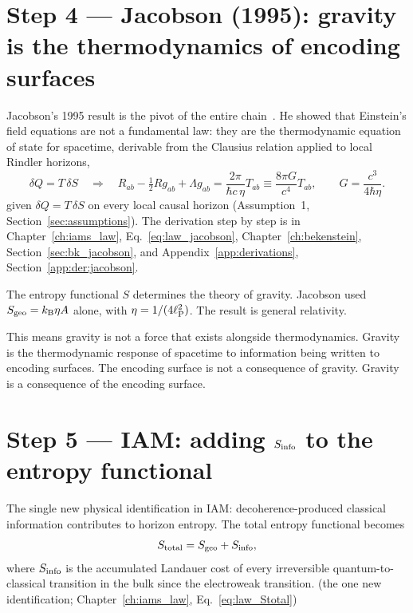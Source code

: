 \section{Step 4 --- Jacobson (1995): gravity is the thermodynamics of encoding surfaces}\label{app:sat:step4}
Jacobson's 1995 result is the pivot of the entire chain~\cite{Jacobson1995}. He showed that Einstein's field equations are not a fundamental
law: they are the thermodynamic equation of state for spacetime, derivable from the Clausius relation applied to local Rindler horizons,
\begin{equation}
\delta Q=T\,\delta S\quad\Longrightarrow\quad
R_{ab}-\tfrac12Rg_{ab}+\Lambda g_{ab}=\frac{2\pi}{\hbar c\,\eta}T_{ab}\equiv\frac{8\pi G}{c^4}T_{ab},\qquad G=\frac{c^3}{4\hbar\eta}. \label{eq:sat_jacobson}
\end{equation}
\derived{} given $\delta Q=T\,\delta S$ on every local causal horizon (Assumption~1, Section~\ref{sec:assumptions}). The derivation step by step is in
Chapter~\ref{ch:iams_law}, Eq.~\eqref{eq:law_jacobson}, Chapter~\ref{ch:bekenstein}, Section~\ref{sec:bk_jacobson}, and
Appendix~\ref{app:derivations}, Section~\ref{app:der:jacobson}.

The entropy functional $S$ determines the theory of gravity. Jacobson used $S_{\rm geo}=k_{\mathrm B}\eta A$ alone, with $\eta=1/(4\ell_{\mathrm P}^2)$. The result is
general relativity.

This means gravity is not a force that exists alongside thermodynamics. Gravity is the thermodynamic response of spacetime to information being
written to encoding surfaces. The encoding surface is not a consequence of gravity. Gravity is a consequence of the encoding surface. \interp

\section{Step 5 --- IAM: adding $S_{\rm info}$ to the entropy functional}\label{app:sat:step5}
The single new physical identification in IAM: decoherence-produced classical information contributes to horizon entropy. The total entropy
functional becomes
\begin{equation}
S_{\rm total}=S_{\rm geo}+S_{\rm info}, \label{eq:sat_Stotal}
\end{equation}
where $S_{\rm info}$ is the accumulated Landauer cost of every irreversible quantum-to-classical transition in the bulk since the electroweak
transition. \conjecture{} (the one new identification; Chapter~\ref{ch:iams_law}, Eq.~\eqref{eq:law_Stotal})

